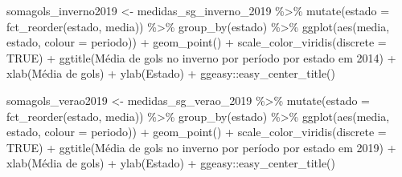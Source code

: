 \documentclass[
]{article}
\newenvironment{Shaded}{\begin{snugshade}}{\end{snugshade}}
\newcommand{\AttributeTok}[1]{\textcolor[rgb]{0.77,0.63,0.00}{#1}}
\newcommand{\ConstantTok}[1]{\textcolor[rgb]{0.00,0.00,0.00}{#1}}
\newcommand{\FunctionTok}[1]{\textcolor[rgb]{0.00,0.00,0.00}{#1}}
\newcommand{\NormalTok}[1]{#1}
\newcommand{\OtherTok}[1]{\textcolor[rgb]{0.56,0.35,0.01}{#1}}
\newcommand{\SpecialCharTok}[1]{\textcolor[rgb]{0.00,0.00,0.00}{#1}}
\newcommand{\StringTok}[1]{\textcolor[rgb]{0.31,0.60,0.02}{#1}}
\begin{document}
\begin{Shaded}
\begin{Highlighting}[]
\NormalTok{somagols\_inverno2019 }\OtherTok{\textless{}{-}}\NormalTok{ medidas\_sg\_inverno\_2019 }\SpecialCharTok{\%\textgreater{}\%} \FunctionTok{mutate}\NormalTok{(}\AttributeTok{estado =} \FunctionTok{fct\_reorder}\NormalTok{(estado, media)) }\SpecialCharTok{\%\textgreater{}\%}
  \FunctionTok{group\_by}\NormalTok{(estado) }\SpecialCharTok{\%\textgreater{}\%}
  \FunctionTok{ggplot}\NormalTok{(}\FunctionTok{aes}\NormalTok{(media, estado, }\AttributeTok{colour =}\NormalTok{ periodo)) }\SpecialCharTok{+} \FunctionTok{geom\_point}\NormalTok{() }\SpecialCharTok{+}
  \FunctionTok{scale\_color\_viridis}\NormalTok{(}\AttributeTok{discrete =} \ConstantTok{TRUE}\NormalTok{) }\SpecialCharTok{+}
  \FunctionTok{ggtitle}\NormalTok{(}\StringTok{\textquotesingle{}Média de gols no inverno por período por estado em 2014\textquotesingle{}}\NormalTok{) }\SpecialCharTok{+} 
  \FunctionTok{xlab}\NormalTok{(}\StringTok{\textquotesingle{}Média de gols\textquotesingle{}}\NormalTok{) }\SpecialCharTok{+} \FunctionTok{ylab}\NormalTok{(}\StringTok{\textquotesingle{}Estado\textquotesingle{}}\NormalTok{) }\SpecialCharTok{+}
\NormalTok{  ggeasy}\SpecialCharTok{::}\FunctionTok{easy\_center\_title}\NormalTok{() }

\NormalTok{somagols\_verao2019 }\OtherTok{\textless{}{-}}\NormalTok{ medidas\_sg\_verao\_2019 }\SpecialCharTok{\%\textgreater{}\%} \FunctionTok{mutate}\NormalTok{(}\AttributeTok{estado =} \FunctionTok{fct\_reorder}\NormalTok{(estado, media)) }\SpecialCharTok{\%\textgreater{}\%} 
  \FunctionTok{group\_by}\NormalTok{(estado) }\SpecialCharTok{\%\textgreater{}\%}
  \FunctionTok{ggplot}\NormalTok{(}\FunctionTok{aes}\NormalTok{(media, estado, }\AttributeTok{colour =}\NormalTok{ periodo)) }\SpecialCharTok{+} \FunctionTok{geom\_point}\NormalTok{() }\SpecialCharTok{+}
  \FunctionTok{scale\_color\_viridis}\NormalTok{(}\AttributeTok{discrete =} \ConstantTok{TRUE}\NormalTok{) }\SpecialCharTok{+}
  \FunctionTok{ggtitle}\NormalTok{(}\StringTok{\textquotesingle{}Média de gols no inverno por período por estado em 2019\textquotesingle{}}\NormalTok{) }\SpecialCharTok{+} 
  \FunctionTok{xlab}\NormalTok{(}\StringTok{\textquotesingle{}Média de gols\textquotesingle{}}\NormalTok{) }\SpecialCharTok{+} \FunctionTok{ylab}\NormalTok{(}\StringTok{\textquotesingle{}Estado\textquotesingle{}}\NormalTok{) }\SpecialCharTok{+}
\NormalTok{  ggeasy}\SpecialCharTok{::}\FunctionTok{easy\_center\_title}\NormalTok{() }



\end{Highlighting}
\end{Shaded}
\end{document}
